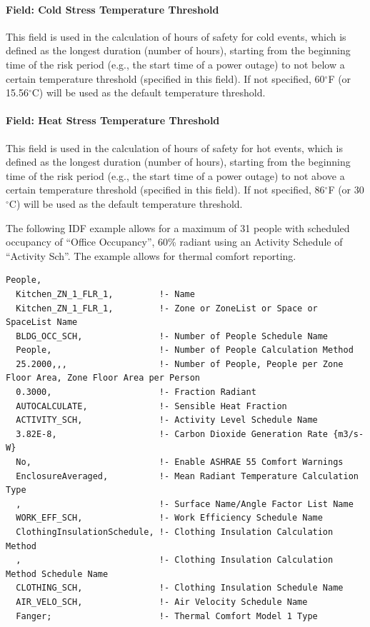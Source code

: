 \paragraph{Field: Cold Stress Temperature Threshold}\label{cold-stress-temperature-threshold}

This field is used in the calculation of hours of safety for cold events, which
is defined as the longest duration (number of hours), starting from the
beginning time of the risk period (e.g., the start time of a power outage) to
not below a certain temperature threshold (specified in this field). If not
specified, 60$^\circ$F (or 15.56$^\circ$C) will be used as the default temperature threshold.

\paragraph{Field: Heat Stress Temperature Threshold}\label{heat-stress-temperature-threshold}

This field is used in the calculation of hours of safety for hot events, which
is defined as the longest duration (number of hours), starting from the
beginning time of the risk period (e.g., the start time of a power outage) to
not above a certain temperature threshold (specified in this field). If not
specified, 86$^\circ$F (or 30$^\circ$C) will be used as the default temperature threshold.

The following IDF example allows for a maximum of 31 people with scheduled occupancy of ``Office Occupancy'', 60\% radiant using an Activity Schedule of ``Activity Sch''. The example allows for thermal comfort reporting.

\begin{lstlisting}
People,
  Kitchen_ZN_1_FLR_1,         !- Name
  Kitchen_ZN_1_FLR_1,         !- Zone or ZoneList or Space or SpaceList Name
  BLDG_OCC_SCH,               !- Number of People Schedule Name
  People,                     !- Number of People Calculation Method
  25.2000,,,                  !- Number of People, People per Zone Floor Area, Zone Floor Area per Person
  0.3000,                     !- Fraction Radiant
  AUTOCALCULATE,              !- Sensible Heat Fraction
  ACTIVITY_SCH,               !- Activity Level Schedule Name
  3.82E-8,                    !- Carbon Dioxide Generation Rate {m3/s-W}
  No,                         !- Enable ASHRAE 55 Comfort Warnings
  EnclosureAveraged,          !- Mean Radiant Temperature Calculation Type
  ,                           !- Surface Name/Angle Factor List Name
  WORK_EFF_SCH,               !- Work Efficiency Schedule Name
  ClothingInsulationSchedule, !- Clothing Insulation Calculation Method
  ,                           !- Clothing Insulation Calculation Method Schedule Name
  CLOTHING_SCH,               !- Clothing Insulation Schedule Name
  AIR_VELO_SCH,               !- Air Velocity Schedule Name
  Fanger;                     !- Thermal Comfort Model 1 Type
\end{lstlisting}

